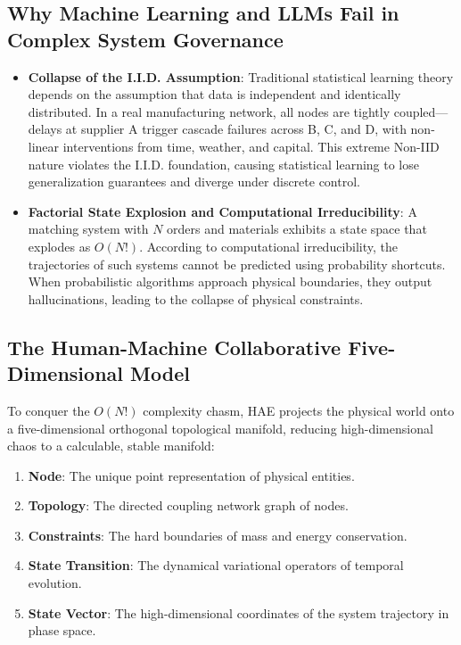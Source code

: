 \documentclass{article}
\begin{document}
\subsection{Why Machine Learning and LLMs Fail in Complex System Governance}
\begin{itemize}
    \item \textbf{Collapse of the I.I.D. Assumption}: Traditional statistical learning theory depends on the assumption that data is independent and identically distributed. In a real manufacturing network, all nodes are tightly coupled—delays at supplier A trigger cascade failures across B, C, and D, with non-linear interventions from time, weather, and capital. This extreme Non-IID nature violates the I.I.D. foundation, causing statistical learning to lose generalization guarantees and diverge under discrete control.
    \item \textbf{Factorial State Explosion and Computational Irreducibility}: A matching system with $N$ orders and materials exhibits a state space that explodes as $O(N!)$. According to computational irreducibility, the trajectories of such systems cannot be predicted using probability shortcuts. When probabilistic algorithms approach physical boundaries, they output hallucinations, leading to the collapse of physical constraints.
\end{itemize}

\subsection{The Human-Machine Collaborative Five-Dimensional Model}
To conquer the $O(N!)$ complexity chasm, HAE projects the physical world onto a five-dimensional orthogonal topological manifold, reducing high-dimensional chaos to a calculable, stable manifold:
\begin{enumerate}
    \item \textbf{Node}: The unique point representation of physical entities.
    \item \textbf{Topology}: The directed coupling network graph of nodes.
    \item \textbf{Constraints}: The hard boundaries of mass and energy conservation.
    \item \textbf{State Transition}: The dynamical variational operators of temporal evolution.
    \item \textbf{State Vector}: The high-dimensional coordinates of the system trajectory in phase space.
\end{enumerate}
\end{document}
